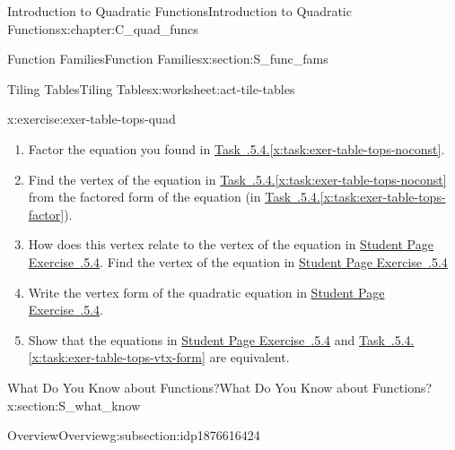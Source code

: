 \documentclass[oneside,10pt,]{book}
\newcommand{\xreffont}{\relax}
\numberwithin{equation}{chapter}
\begin{document}
\begin{chapterptx}{Introduction to Quadratic Functions}{}{Introduction to Quadratic Functions}{}{}{x:chapter:C_quad_funcs}
\begin{sectionptx}{Function Families}{}{Function Families}{}{}{x:section:S_func_fams}
\begin{worksheet-subsection}{Tiling Tables}{}{Tiling Tables}{}{}{x:worksheet:act-tile-tables}
\begin{divisionexercise}{4}{}{}{x:exercise:exer-table-tops-quad}
\begin{enumerate}[font=\bfseries,label=(\alph*),ref=\alph*]
\item\label{x:task:exer-table-tops-factor}Factor the equation you found in \hyperref[x:task:exer-table-tops-noconst]{Task~{\xreffont 4.5.5.4}.{\xreffont\ref{x:task:exer-table-tops-noconst}}}.%
\item{}Find the vertex of the equation in \hyperref[x:task:exer-table-tops-noconst]{Task~{\xreffont 4.5.5.4}.{\xreffont\ref{x:task:exer-table-tops-noconst}}} from the factored form of the equation (in \hyperref[x:task:exer-table-tops-factor]{Task~{\xreffont 4.5.5.4}.{\xreffont\ref{x:task:exer-table-tops-factor}}}).%
\item{}How does this vertex relate to the vertex of the equation in \hyperlink{x:exercise:exer-table-tops-quad}{Student Page Exercise~{\xreffont 4.5.5.4}}. Find the vertex of the equation in \hyperlink{x:exercise:exer-table-tops-quad}{Student Page Exercise~{\xreffont 4.5.5.4}}%
\item\label{x:task:exer-table-tops-vtx-form}Write the vertex form of the quadratic equation in \hyperlink{x:exercise:exer-table-tops-quad}{Student Page Exercise~{\xreffont 4.5.5.4}}.%
\item{}Show that the equations in \hyperlink{x:exercise:exer-table-tops-quad}{Student Page Exercise~{\xreffont 4.5.5.4}} and \hyperref[x:task:exer-table-tops-vtx-form]{Task~{\xreffont 4.5.5.4}.{\xreffont\ref{x:task:exer-table-tops-vtx-form}}} are equivalent.%
\end{enumerate}
\end{divisionexercise}%
\end{worksheet-subsection}
\restoregeometry
\end{sectionptx}
%
%
\typeout{************************************************}
\typeout{************************************************}
%
\begin{sectionptx}{What Do You Know about Functions?}{}{What Do You Know about Functions?}{}{}{x:section:S_what_know}
%
%
\typeout{************************************************}
\typeout{************************************************}
%
\begin{subsectionptx}{Overview}{}{Overview}{}{}{g:subsection:idp1876616424}

\end{subsectionptx}
\end{sectionptx}
\end{chapterptx}
\end{document}
